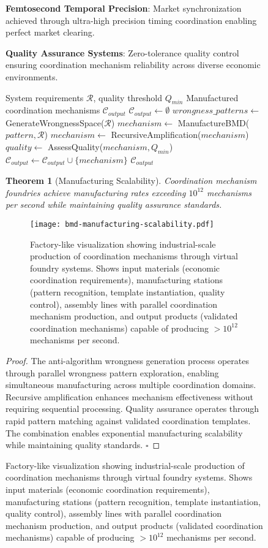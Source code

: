 \documentclass[12pt,a4paper]{article}
\newtheorem{theorem}{Theorem}
\begin{document}
\begin{figure}[H]
\textbf{Femtosecond Temporal Precision}: Market synchronization achieved through ultra-high precision timing coordination enabling perfect market clearing.

\textbf{Quality Assurance Systems}: Zero-tolerance quality control ensuring coordination mechanism reliability across diverse economic environments.

\begin{algorithm}
\caption{Industrial BMD Coordination Manufacturing}
\begin{algorithmic}[1]
\Require System requirements $\mathcal{R}$, quality threshold $Q_{min}$
\Ensure Manufactured coordination mechanisms $\mathcal{C}_{output}$
\State $\mathcal{C}_{output} \leftarrow \emptyset$
\State $wrongness\_patterns \leftarrow$ GenerateWrongnessSpace($\mathcal{R}$)
    \State $mechanism \leftarrow$ ManufactureBMD($pattern, \mathcal{R}$)
    \State $mechanism \leftarrow$ RecursiveAmplification($mechanism$)
    \State $quality \leftarrow$ AssessQuality($mechanism, Q_{min}$)
        \State $\mathcal{C}_{output} \leftarrow \mathcal{C}_{output} \cup \{mechanism\}$
    \EndIf
\EndFor
\Return $\mathcal{C}_{output}$
\end{algorithmic}
\end{algorithm}

\begin{theorem}[Manufacturing Scalability]
Coordination mechanism foundries achieve manufacturing rates exceeding $10^{12}$ mechanisms per second while maintaining quality assurance standards.
\end{theorem}

\begin{figure}[H]
\centering
\texttt{[image: bmd-manufacturing-scalability.pdf]}
\caption{Factory-like visualization showing industrial-scale production of coordination mechanisms through virtual foundry systems. Shows input materials (economic coordination requirements), manufacturing stations (pattern recognition, template instantiation, quality control), assembly lines with parallel coordination mechanism production, and output products (validated coordination mechanisms) capable of producing $>10^{12}$ mechanisms per second.}
\label{fig:bmd-manufacturing-scalability}
\end{figure}

\begin{proof}
The anti-algorithm wrongness generation process operates through parallel wrongness pattern exploration, enabling simultaneous manufacturing across multiple coordination domains. Recursive amplification enhances mechanism effectiveness without requiring sequential processing. Quality assurance operates through rapid pattern matching against validated coordination templates. The combination enables exponential manufacturing scalability while maintaining quality standards. $\square$
\end{proof}


\end{figure}
\end{document}
